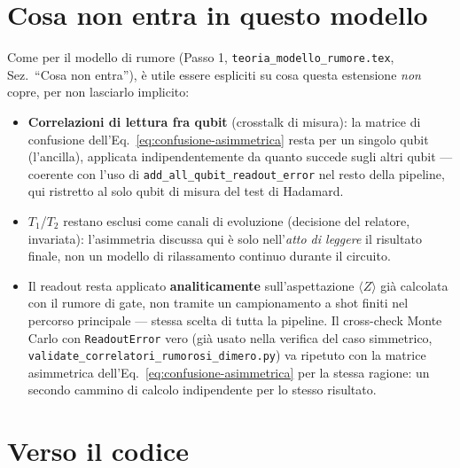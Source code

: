 \documentclass[11pt,a4paper]{article}
\begin{document}
\section{Cosa non entra in questo modello}
\label{sec:cosa-non-entra-asimmetria}

Come per il modello di rumore (Passo 1, \texttt{teoria\_modello\_rumore.tex},
Sez.~``Cosa non entra''), è utile essere espliciti su cosa questa
estensione \emph{non} copre, per non lasciarlo implicito:
\begin{itemize}[leftmargin=1.3em,itemsep=0.2em]
\item \textbf{Correlazioni di lettura fra qubit} (crosstalk di misura): la
matrice di confusione dell'Eq.~\eqref{eq:confusione-asimmetrica} resta
per un singolo qubit (l'ancilla), applicata indipendentemente da quanto
succede sugli altri qubit --- coerente con l'uso di
\texttt{add\_all\_qubit\_readout\_error} nel resto della pipeline, qui
ristretto al solo qubit di misura del test di Hadamard.
\item $T_1$/$T_2$ restano esclusi come canali di evoluzione (decisione
del relatore, invariata): l'asimmetria discussa qui è solo
nell'\emph{atto di leggere} il risultato finale, non un modello di
rilassamento continuo durante il circuito.
\item Il readout resta applicato \textbf{analiticamente}
sull'aspettazione $\langle Z\rangle$ già calcolata con il rumore di gate,
non tramite un campionamento a shot finiti nel percorso principale ---
stessa scelta di tutta la pipeline. Il cross-check Monte Carlo con
\texttt{ReadoutError} vero (già usato nella verifica del caso simmetrico,
\texttt{validate\_correlatori\_rumorosi\_dimero.py}) va ripetuto con la
matrice asimmetrica dell'Eq.~\eqref{eq:confusione-asimmetrica} per la
stessa ragione: un secondo cammino di calcolo indipendente per lo stesso
risultato.
\end{itemize}

\section{Verso il codice}
\label{sec:verso-il-codice}
\end{document}
